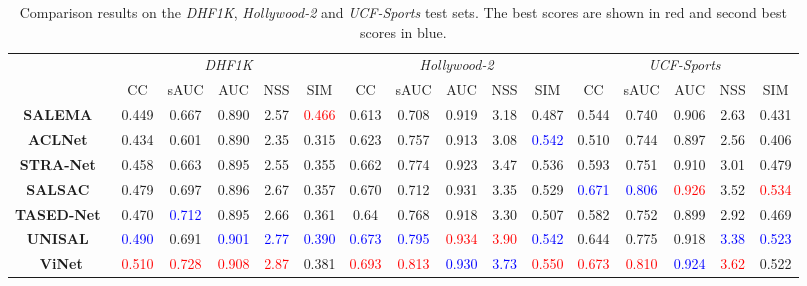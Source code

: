 \documentclass[letterpaper, 10 pt, conference]{ieeeconf}  \usepackage{times}
\begin{document}
\begin{table*}[t]
     \footnotesize
     \begin{center}
         
     
    \begin{tabular}{|c|ccccc|ccccc|ccccc|}
    \hline
     & \multicolumn{5}{c|}{\emph{DHF1K}} &  \multicolumn{5}{c|}{\emph{Hollywood-2}} &  \multicolumn{5}{c|}{\emph{UCF-Sports}} \\
        & CC  & sAUC     & AUC    & NSS    & SIM & CC  & sAUC     & AUC    & NSS    & SIM & CC  & sAUC     & AUC    & NSS    & SIM\\
    \hline\hline
    \textbf{SALEMA}~\cite{linardos2019simple}                 &0.449	&0.667	&0.890	&2.57	&\textcolor{red}{0.466}	&0.613	&0.708	&0.919	&3.18	&0.487	&0.544	&0.740	&0.906	&2.63	&0.431\\
    \textbf{ACLNet}~\cite{wang2019revisiting}                 &0.434	&0.601	&0.890	&2.35	&0.315	&0.623	&0.757	&0.913	&3.08	&\textcolor{blue}{0.542}	&0.510	&0.744	&0.897	&2.56	&0.406 \\
    \textbf{STRA-Net}~\cite{lai2019video}               &0.458	&0.663	&0.895	&2.55	&0.355	&0.662	&0.774	&0.923	&3.47	&0.536	&0.593	&0.751	&0.910	&3.01	&0.479 \\
    \textbf{SALSAC}~\cite{wu2020salsac}                 &0.479	&0.697	&0.896	&2.67	&0.357	&0.670	&0.712	&0.931	&3.35	&0.529	&\textcolor{blue}{0.671}	&\textcolor{blue}{0.806}	&\textcolor{red}{0.926}	&3.52	&\textcolor{red}{0.534}\\
    \textbf{TASED-Net}~\cite{min2019tased}               &0.470	&\textcolor{blue}{0.712}	&0.895	&2.66	&0.361	&0.64	&0.768	&0.918	&3.30	&0.507	&0.582	&0.752	&0.899	&2.92	&0.469\\
    \textbf{UNISAL}~\cite{droste2020unified}                 &\textcolor{blue}{0.490}	&0.691	&\textcolor{blue}{0.901}	&\textcolor{blue}{2.77}	&\textcolor{blue}{0.390}	&\textcolor{blue}{0.673}	&\textcolor{blue}{0.795}	&\textcolor{red}{0.934}	&\textcolor{red}{3.90}	&\textcolor{blue}{0.542}	&0.644	&0.775	&0.918	&\textcolor{blue}{3.38}	&\textcolor{blue}{0.523}\\
    \hline
    \textbf{ViNet}                  	&\textcolor{red}{0.510}	&\textcolor{red}{0.728}	&\textcolor{red}{0.908}	&\textcolor{red}{2.87}	&0.381	&\textcolor{red}{0.693}	&\textcolor{red}{0.813}	&\textcolor{blue}{0.930}	&\textcolor{blue}{3.73}	&\textcolor{red}{0.550}	&\textcolor{red}{0.673} &	\textcolor{red}{0.810}	&\textcolor{blue}{0.924}	&\textcolor{red}{3.62}	&0.522\\
    \hline
    \end{tabular}
    \end{center}
    \caption{Comparison results on the \emph{DHF1K}, \emph{Hollywood-2} and \emph{UCF-Sports} test sets. The best scores are shown in red and second best scores in blue.}
    \label{table:test_results}
\end{table*}
\end{document}
